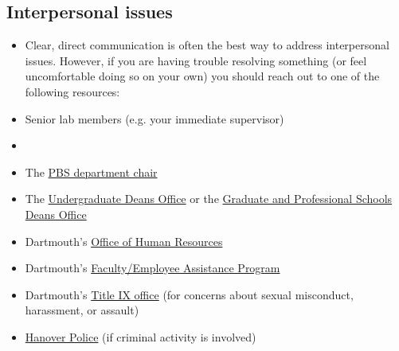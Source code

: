 \documentclass{tufte-book} %
\begin{document}
\subsection{Interpersonal issues}\label{sec:interpersonal}
\begin{itemize}
\item Clear, direct communication is often the best way to address interpersonal issues. However, if you are having trouble resolving something (or feel uncomfortable doing so on your own) you should reach out to one of the following resources:

\item Senior lab members (e.g. your immediate supervisor)

\item \director

\item The \href{https://pbs.dartmouth.edu/people}{PBS department chair}

\item The \href{https://students.dartmouth.edu/undergraduate-deans/}{Undergraduate Deans Office} or the \href{mailto:Graduate.and.Advanced.Studies@Dartmouth.edu}{Graduate and Professional Schools Deans Office}

\item Dartmouth's \href{https://www.dartmouth.edu/~hrs/}{Office of Human Resources}

\item Dartmouth's \href{https://www.dartmouth.edu/~eap/}{Faculty/Employee Assistance Program}

\item Dartmouth's \href{https://sexual-respect.dartmouth.edu/}{Title IX office} (for concerns about sexual misconduct, harassment, or assault)

\item \href{https://www.hanovernh.org/hanover-police-department}{Hanover Police} (if criminal activity is involved)
\end{itemize}





\end{document}
